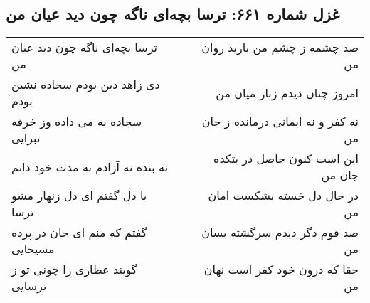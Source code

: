 \begin{center}
\section*{غزل شماره ۶۶۱: ترسا بچه‌ای ناگه چون دید عیان من}
\label{sec:661}
\begin{longtable}{l p{0.5cm} r}
ترسا بچه‌ای ناگه چون دید عیان من
&&
صد چشمه ز چشم من بارید روان من
\\
دی زاهد دین بودم سجاده نشین بودم
&&
امروز چنان دیدم زنار میان من
\\
سجاده به می داده وز خرقه تبرایی
&&
نه کفر و نه ایمانی درمانده ز جان من
\\
نه بنده نه آزادم نه مدت خود دانم
&&
این است کنون حاصل در بتکده جان من
\\
با دل گفتم ای دل زنهار مشو ترسا
&&
در حال دل خسته بشکست امان من
\\
گفتم که منم ای جان در پرده مسیحایی
&&
صد قوم دگر دیدم سرگشته بسان من
\\
گویند عطاری را چونی تو ز ترسایی
&&
حقا که درون خود کفر است نهان من
\\
\end{longtable}
\end{center}
